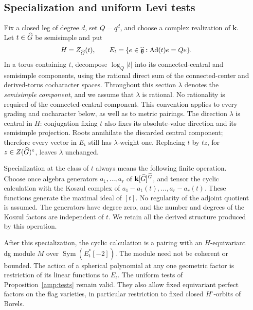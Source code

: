 \subsection{Specialization and uniform Levi tests}

Fix a closed leg of degree $d$, set $Q=q^d$, and choose a complex
realization of $\mathbf k$.  Let $t\in\widehat G$ be semisimple and put
\[
 H=Z_{\widehat G}(t),\qquad
 E_t=\{e\in\widehat{\mathfrak g}:\operatorname{Ad}(t)e=Qe\}.
\]
In a torus containing $t$, decompose $\log_Q|t|$ into its
connected-central and semisimple components, using the rational
direct sum of the connected-center and derived-torus cocharacter
spaces.  Throughout this section $\lambda$ denotes the
\emph{semisimple component}, and we assume that $\lambda$ is
rational.  No rationality is required of the connected-central
component.  This convention applies to every grading and
cocharacter below, as well as to metric pairings.
The direction $\lambda$ is central in $H$: conjugation fixing $t$
also fixes its absolute-value direction and its semisimple
projection.  Roots annihilate the discarded central component;
therefore every vector in $E_t$ still has $\lambda$-weight one.
Replacing $t$ by $tz$, for $z\in Z(\widehat G)^\circ$, leaves
$\lambda$ unchanged.

Specialization at the class of $t$ always means the following finite
operation. Choose once algebra generators $a_1,\ldots,a_r$ of
$\mathbf k[\widehat G]^{\widehat G}$, and tensor the cyclic calculation with
the Koszul complex of $a_1-a_1(t),\ldots,a_r-a_r(t)$. These functions
generate the maximal ideal of $[t]$. No regularity of the adjoint
quotient is assumed. The generators have degree zero, and the number
and degrees of the Koszul factors are independent of $t$. We retain
all the derived structure produced by this operation.

\begin{lemma}
\label{amp:specialization}
After this specialization, the cyclic calculation is a pairing
with an $H$-equivariant dg module $M$ over
$\operatorname{Sym}(E_t^*[-2])$.  The module need not be coherent
or bounded.  The action of a spherical polynomial at any one
geometric factor is restriction of its linear functions to $E_t$.
The uniform tests of Proposition~\ref{amp:tests} remain valid.
They also allow fixed equivariant perfect factors on the flag
varieties, in particular restriction to fixed closed
$H^\circ$-orbits of Borels.
\end{lemma}

